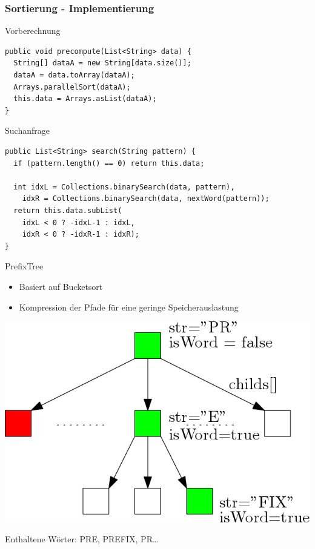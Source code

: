 \documentclass[11pt, xcolor=dvipsnames]{beamer}
\begin{document}
\begin{frame}[fragile]
	\frametitle{Sortierung - Implementierung}
	Vorberechnung
	\begin{lstlisting}
public void precompute(List<String> data) {
  String[] dataA = new String[data.size()];
  dataA = data.toArray(dataA);
  Arrays.parallelSort(dataA);
  this.data = Arrays.asList(dataA);		
}	
	\end{lstlisting}
	Suchanfrage
	\begin{lstlisting}
public List<String> search(String pattern) {
  if (pattern.length() == 0) return this.data;
	
  int idxL = Collections.binarySearch(data, pattern),
    idxR = Collections.binarySearch(data, nextWord(pattern));
  return this.data.subList(
	idxL < 0 ? -idxL-1 : idxL, 
	idxR < 0 ? -idxR-1 : idxR);
}
	\end{lstlisting}
\end{frame}

	
	\begin{frame}{PrefixTree}
		\begin{itemize}
			\item Basiert auf Bucketsort\\						
			\item Kompression der Pfade für eine geringe Speicherauslastung
		\end{itemize}
		\begin{center}
		\includegraphics[scale=0.3]{pics/prefixtree.png}
		
		Enthaltene Wörter: PRE, PREFIX, PR\ldots
		\end{center}
		

	\end{frame}
	
\end{document}

